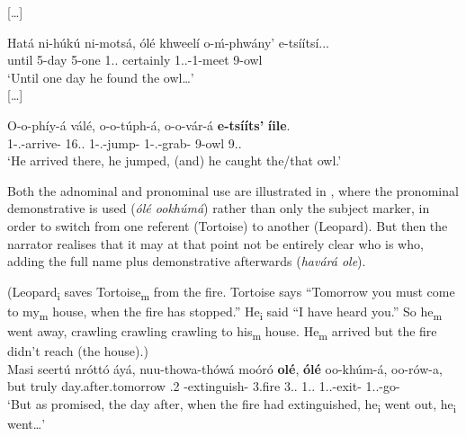 \documentclass[output=paper]{langscibook}
\begin{document}
  […]

\gll
Hatá  ni-húkú  ni-motsá,  ólé  khweelí  o-ḿ-phwány’  e-tsíítsí...{\footnotemark}  \\
until  5-day  5-one  1.\DEM{}.\DIST{}  certainly  1\SM{}.\PFV{}.\DJ{}-1\OM{}-meet  9-owl\\
\glt
‘Until one day he found the owl…’\\

  […]


\gll
  O-o-phíy-á  válé,  o-o-túph-á, o-o-vár-á  \textbf{e-tsííts’}  \textbf{íile}. \\
1\SM{}-\PFV{}.\DJ{}-arrive-\FV{}  16.\DEM{}.\DIST{}  1\SM{}-\PFV{}.\DJ{}-jump-\FV{}  1\SM{}-\PFV{}.\DJ{}-grab-\FV{}  9-owl  9.\DEM{}.\DIST{}\\
\glt
‘He arrived there, he jumped, (and) he caught the/that owl.’\\

\z

Both the adnominal and pronominal use are illustrated in , where the pronominal demonstrative is used (\textit{ólé ookhúmá}) rather than only the subject marker, in order to switch from one referent (Tortoise) to another (Leopard). But then the narrator realises that it may at that point not be entirely clear who is who, adding the full name plus demonstrative afterwards (\textit{havárá ole}).

\ea
\label{bkm:Ref96850547}
(Leopard\textsubscript{i} saves Tortoise\textsubscript{m} from the fire. Tortoise says “Tomorrow you must come to my\textsubscript{m} house, when the fire has stopped.” He\textsubscript{i} said “I have heard you.” So he\textsubscript{m} went away, crawling crawling crawling to his\textsubscript{m} house. He\textsubscript{m} arrived but the fire didn’t reach (the house).)\\
\gll
Masi  seertú  nróttó  áyá,  nuu-thowa-thówá  moóró  \textbf{olé},    \textbf{ólé}  oo-khúm-á,  oo-rów-a, \\
but  truly  day.after.tomorrow  \POSS{}.2  \RSM{}-extinguish-\RED{}  3.fire  3.\DEM{}.\DIST{} 1.\DEM{}.\DIST{}  1\SM{}.\PFV{}.\DJ{}-{}exit-\FV{}  1\SM{}.\PFV{}.\DJ{}-go-\FV{} \\
\glt
‘But as promised, the day after, when the fire had extinguished, he\textsubscript{i} went out, he\textsubscript{i} went…’\\
\end{document}
